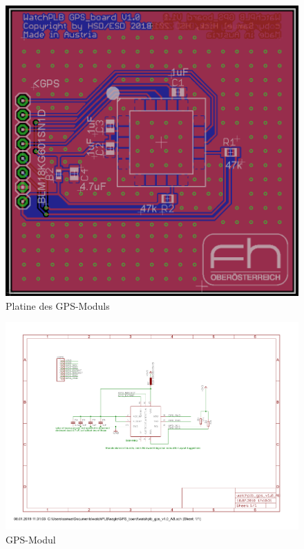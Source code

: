 \documentclass[a4paper]{scrartcl}
\begin{document}
\begin{figure}[H]\centering
\includegraphics[page=1, angle=0, scale=0.4]{../Documentation/pics/gpsboard.png}
\caption{Platine des GPS-Moduls}
\label{fig:abb1}
\end{figure}

\begin{figure}[H]\centering
\includegraphics[page=1, angle=90, width=\linewidth]{../eagle/GPS_board/watchplb_gps_v1_0_AB.pdf}
\caption{GPS-Modul}
\label{fig:abb1}
\end{figure}
\end{document}
